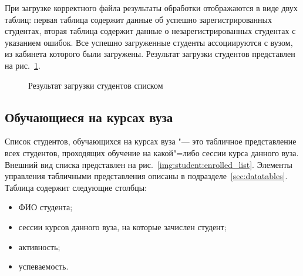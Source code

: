 При загрузке корректного файла результаты обработки отображаются в виде двух таблиц: 
первая таблица содержит данные об успешно зарегистрированных студентах, 
вторая таблица содержит данные о незарегистрированных студентах с указанием ошибок. 
Все успешно загруженные студенты ассоциируются с вузом, из кабинета которого были загружены.
Результат загрузки студентов представлен на рис.~\ref{img:student:mass_invite_result}.

\begin{figure}[H]
	\caption{Результат загрузки студентов списком}
	\label{img:student:mass_invite_result}
\end{figure}

\subsection{Обучающиеся на курсах вуза}
Список студентов, обучающихся на курсах вуза "--- это табличное представление всех студентов, 
проходящих обучение на какой"=либо сессии курса данного вуза.
Внешний вид списка представлен на рис.~\ref{img:student:enrolled_list}. 
Элементы управления табличными представления описаны в подразделе~\ref{sec:datatables}.
Таблица содержит следующие столбцы:
\begin{itemize}
	\item ФИО студента;
	\item сессии курсов данного вуза, на которые зачислен студент;
	\item активность;
	\item успеваемость.
\end{itemize}

